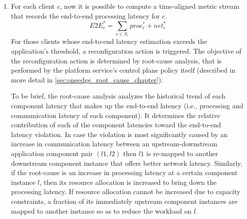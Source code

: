 \begin{enumerate}
\item For each client $c$, now it is possible to compute a time-aligned metric stream that records the end-to-end processing latency for $c$.
\begin{equation}
E2E_c^* = \sum_{e \in S_c} proc_e^* + net_e^*
\end{equation}
For those clients whose end-to-end latency estimation exceeds the application's threshold, a reconfiguration action is triggered. The objective of the reconfiguration action is determined by root-cause analysis, that is performed by the platform service's control plane policy itself (described in more detail in \cref{sec:oneedge_root_cause_chapter}). 
\par To be brief, the root-cause analysis analyzes the historical trend of each component latency that makes up the end-to-end latency (i.e., processing and communication latency of each component). It determines the relative contribution of each of the component latencies toward the end-to-end latency violation. In case the violation is most significantly caused by an increase in communication latency between an upstream-downstream application component pair $\left( l1, l2 \right)$ then $l1$ is re-mapped to another downstream component instance that offers  better network latency. Similarly, if the root-cause is an increase in processing latency at a certain component instance $l$, then its resource allocation is increased to bring down the processing latency. If resource allocation cannot be increased due to capacity constraints, a fraction of its immediately upstream component instances are mapped to another instance so as to reduce the workload on $l$. 
\end{enumerate}


